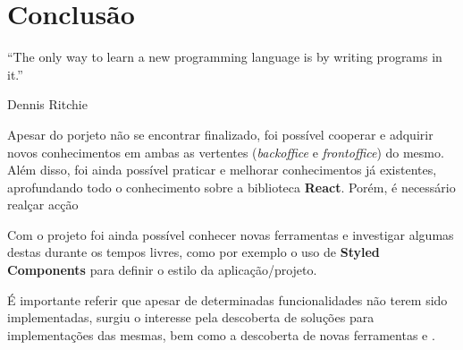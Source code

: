 \chapter{Conclusão}

\begin{flushright}
	\begin{quotebox50}
		\large
		“The only way to learn a new programming language is by writing programs in it.”

		\tcblower
		Dennis Ritchie
	\end{quotebox50}
\end{flushright}

Apesar do porjeto não se encontrar finalizado, foi possível cooperar e adquirir novos conhecimentos em ambas as vertentes (\textit{backoffice} e \textit{frontoffice}) do mesmo. Além disso, foi ainda possível praticar e melhorar conhecimentos já existentes, aprofundando todo o conhecimento sobre a biblioteca \textbf{React}. Porém, é necessário realçar acção

Com o projeto foi ainda possível conhecer novas ferramentas e investigar algumas destas durante os tempos livres, como por exemplo o uso de \textbf{Styled Components} para definir o estilo da aplicação/projeto.

É importante referir que apesar de determinadas funcionalidades não terem sido implementadas, surgiu o interesse pela descoberta de soluções para implementações das mesmas, bem como a descoberta de novas ferramentas e \textit{}.



